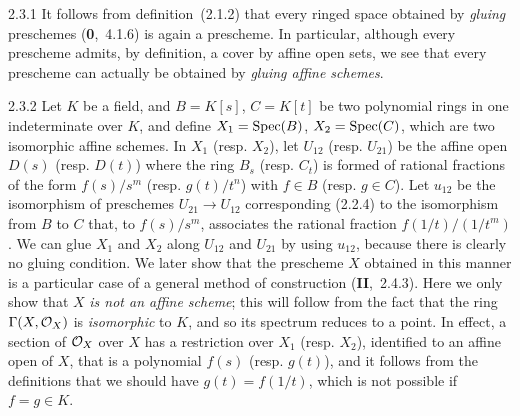 \documentclass[../main.tex]{subfiles}
\begin{document}
\begin{cx}{2.3.1}
    It follows from definition~(2.1.2) that every ringed space obtained by \emph{gluing} preschemes (\textbf{0},~4.1.6) is again a prescheme.
    In particular, although every prescheme admits, by definition, a cover by affine open sets, we see that every prescheme can actually be obtained by \emph{gluing affine schemes}.
\end{cx}

\begin{cx}[Example]{2.3.2}
    Let $K$ be a field, and $B=K[s]$, $C=K[t]$ be two polynomial rings in one indeterminate over $K$, and define $X_1=\operatorname*{Spec}(B)$, $X_2=\operatorname*{Spec}(C)$, which are two isomorphic affine schemes.
    In $X_1$ (resp. $X_2$), let $U_{12}$ (resp. $U_{21}$) be the affine open $D(s)$ (resp. $D(t)$) where the ring $B_s$ (resp. $C_t$) is formed of rational fractions of the form $f(s)/s^m$ (resp. $g(t)/t^n$) with $f\in B$ (resp. $g\in C$).
    Let $u_{12}$ be the isomorphism of preschemes $U_{21}\to U_{12}$ corresponding (2.2.4) to the isomorphism from $B$ to $C$ that, to $f(s)/s^m$, associates the rational fraction $f(1/t)/(1/t^m)$.
    We can glue $X_1$ and $X_2$ along $U_{12}$ and $U_{21}$ by using $u_{12}$, because there is clearly no gluing condition.
    We later show that the prescheme $X$ obtained in this manner is a particular case of a general method of construction (\textbf{II},~2.4.3).
    Here we only show that $X$ \emph{is not an affine scheme}; this will follow from the fact that the ring $\Gamma(X,\mathcal{O}_X)$ is \emph{isomorphic} to $K$, and so its spectrum reduces to a point.
    In effect, a section of $\mathcal{O}_X$ over $X$ has a restriction over $X_1$ (resp. $X_2$), identified to an affine open of $X$, that is a polynomial $f(s)$ (resp. $g(t)$), and it follows from the definitions that we should have $g(t)=f(1/t)$, which is not possible if $f=g\in K$.
\end{cx}
\end{document}
